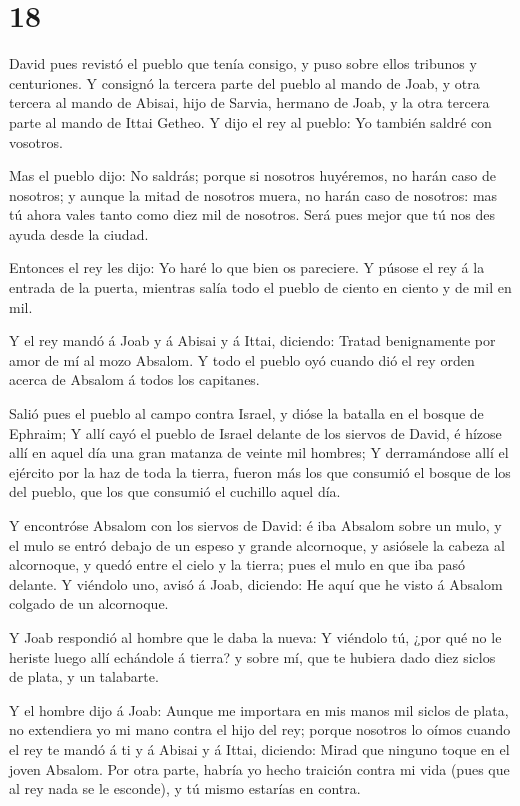 \hypertarget{section-17}{%
\section{18}\label{section-17}}

 David pues revistó el pueblo que tenía consigo, y puso
sobre ellos tribunos y centuriones.  Y consignó la tercera
parte del pueblo al mando de Joab, y otra tercera al mando de Abisai,
hijo de Sarvia, hermano de Joab, y la otra tercera parte al mando de
Ittai Getheo. Y dijo el rey al pueblo: Yo también saldré con vosotros.

 Mas el pueblo dijo: No saldrás; porque si nosotros
huyéremos, no harán caso de nosotros; y aunque la mitad de nosotros
muera, no harán caso de nosotros: mas tú ahora vales tanto como diez mil
de nosotros. Será pues mejor que tú nos des ayuda desde la ciudad.

 Entonces el rey les dijo: Yo haré lo que bien os pareciere.
Y púsose el rey á la entrada de la puerta, mientras salía todo el pueblo
de ciento en ciento y de mil en mil.

 Y el rey mandó á Joab y á Abisai y á Ittai, diciendo:
Tratad benignamente por amor de mí al mozo Absalom. Y todo el pueblo oyó
cuando dió el rey orden acerca de Absalom á todos los capitanes.

 Salió pues el pueblo al campo contra Israel, y dióse la
batalla en el bosque de Ephraim;  Y allí cayó el pueblo de
Israel delante de los siervos de David, é hízose allí en aquel día una
gran matanza de veinte mil hombres;  Y derramándose allí el
ejército por la haz de toda la tierra, fueron más los que consumió el
bosque de los del pueblo, que los que consumió el cuchillo aquel día.

 Y encontróse Absalom con los siervos de David: é iba
Absalom sobre un mulo, y el mulo se entró debajo de un espeso y grande
alcornoque, y asiósele la cabeza al alcornoque, y quedó entre el cielo y
la tierra; pues el mulo en que iba pasó delante.  Y
viéndolo uno, avisó á Joab, diciendo: He aquí que he visto á Absalom
colgado de un alcornoque.

 Y Joab respondió al hombre que le daba la nueva: Y
viéndolo tú, ¿por qué no le heriste luego allí echándole á tierra? y
sobre mí, que te hubiera dado diez siclos de plata, y un talabarte.

 Y el hombre dijo á Joab: Aunque me importara en mis manos
mil siclos de plata, no extendiera yo mi mano contra el hijo del rey;
porque nosotros lo oímos cuando el rey te mandó á ti y á Abisai y á
Ittai, diciendo: Mirad que ninguno toque en el joven Absalom.
 Por otra parte, habría yo hecho traición contra mi vida
(pues que al rey nada se le esconde), y tú mismo estarías en contra.

